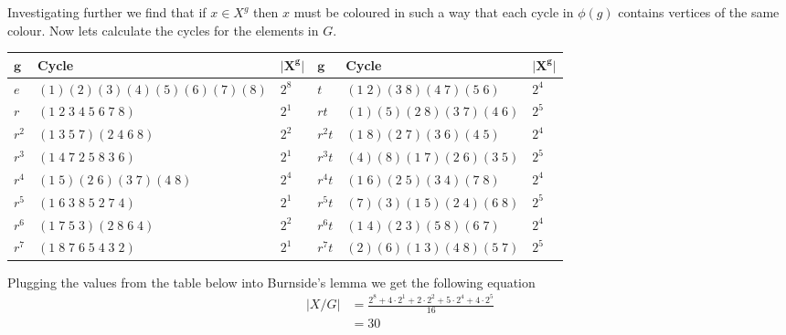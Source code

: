 \documentclass[../main.tex]{subfiles}
\begin{document}
    Investigating further we find that if $x \in X^g$ then $x$ must be coloured in such a way that each cycle in $\phi(g)$ contains vertices of the same colour. Now lets calculate the cycles for the elements in $G$.
    \hfill
    \begin{center}
        \begin{tabular}{ |p{1cm}|p{5cm}|p{1cm}||p{1cm}|p{5cm}|p{1cm}|  }
            \hline
            $\mathbf{g}$ & \textbf{Cycle} & $\lvert \mathbf{X^g} \rvert$ &$\mathbf{g}$ & \textbf{Cycle} & $\lvert \mathbf{X^g} \rvert$ \\
            \hline
            \hline
            $e$     & $(1)(2)(3)(4)(5)(6)(7)(8)$ & $2^8$    &                $t$     & $(1\;2)(3\;8)(4\;7)(5\;6)$ & $2^4$    \\
            \hline
            $r$     & $(1\;2\;3\;4\;5\;6\;7\;8)$ & $2^1$    &                $rt$    & $(1)(5)(2\;8)(3\;7)(4\;6)$ & $2^5$    \\
            \hline
            $r^2$   & $(1\;3\;5\;7)(2\;4\;6\;8)$ & $2^2$    &                $r^2t$  & $(1\;8)(2\;7)(3\;6)(4\;5)$ & $2^4$    \\
            \hline
            $r^3$   & $(1\;4\;7\;2\;5\;8\;3\;6)$ & $2^1$    &                $r^3t$  & $(4)(8)(1\;7)(2\;6)(3\;5)$ & $2^5$    \\
            \hline
            $r^4$   & $(1\;5)(2\;6)(3\;7)(4\;8)$ & $2^4$    &                $r^4t$  & $(1\;6)(2\;5)(3\;4)(7\;8)$ & $2^4$    \\
            \hline
            $r^5$   & $(1\;6\;3\;8\;5\;2\;7\;4)$ & $2^1$    &                $r^5t$  & $(7)(3)(1\;5)(2\;4)(6\;8)$ & $2^5$    \\
            \hline
            $r^6$   & $(1\;7\;5\;3)(2\;8\;6\;4)$ & $2^2$    &                $r^6t$  & $(1\;4)(2\;3)(5\;8)(6\;7)$ & $2^4$    \\
            \hline
            $r^7$   & $(1\;8\;7\;6\;5\;4\;3\;2)$ & $2^1$    &                $r^7t$  & $(2)(6)(1\;3)(4\;8)(5\;7)$ & $2^5$    \\
            \hline
        \end{tabular}
    \end{center}
    \hfill

    Plugging the values from the table below into Burnside's lemma we get the following equation
    \begin{equation*}
        \begin{split}
            \lvert X / G \rvert & = \frac{2^8 + 4 \cdot 2^1 + 2 \cdot 2^2 + 5 \cdot 2^4 +4 \cdot 2^5}{16} \\
            & = 30
        \end{split}
    \end{equation*}
    
\end{document}
